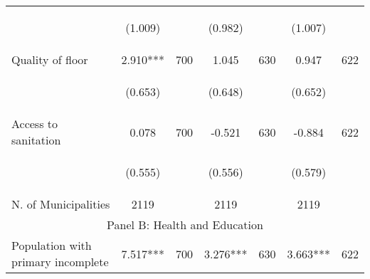 \begin{tabular}{lcccccc}
\vspace{4pt} &  \begin{footnotesize}(1.009)\end{footnotesize}   & &
			    \begin{footnotesize}(0.982)\end{footnotesize}   & &
			    \begin{footnotesize}(1.007)\end{footnotesize}   &
			     \\          



Quality of floor   &  2.910***   &  700  &   1.045  &  630 &  0.947  &  622   \\

\vspace{4pt} &  \begin{footnotesize}(0.653)\end{footnotesize}   & &
			    \begin{footnotesize}(0.648)\end{footnotesize}   & &
			    \begin{footnotesize}(0.652)\end{footnotesize}   &
			     \\          

Access to sanitation   &  0.078   &  700  &   -0.521  &  630 &  -0.884  &  622   \\

\vspace{4pt} &  \begin{footnotesize}(0.555)\end{footnotesize}   & &
			    \begin{footnotesize}(0.556)\end{footnotesize}   & &
			    \begin{footnotesize}(0.579)\end{footnotesize}   &
			     \\          

N. of Municipalities  &   2119   &  &  2119    & &  2119  &    \\

\hline		
\multicolumn{7}{c}{Panel B: Health and Education}   \\                                                          


Population with primary incomplete   &  7.517***   &  700  &   3.276***  &  630 &  3.663***  &  622   \\



\end{tabular}
